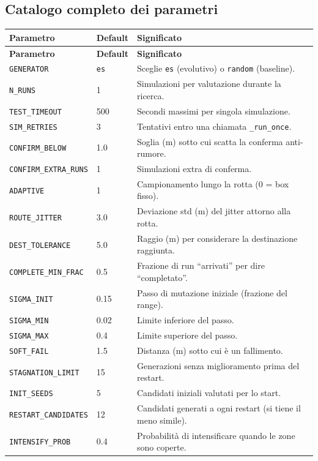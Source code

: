 \documentclass[11pt,a4paper]{report}
\newcommand{\code}[1]{\texttt{#1}}
\begin{document}
\subsection{Catalogo completo dei parametri}
\begin{longtable}{L{3.6cm} L{1.8cm} L{8.6cm}}
\toprule
\textbf{Parametro} & \textbf{Default} & \textbf{Significato}\\
\midrule
\endfirsthead
\toprule
\textbf{Parametro} & \textbf{Default} & \textbf{Significato}\\
\midrule
\endhead
\code{GENERATOR} & \code{es} & Sceglie \code{es} (evolutivo) o \code{random} (baseline).\\
\code{N\_RUNS} & 1 & Simulazioni per valutazione durante la ricerca.\\
\code{TEST\_TIMEOUT} & 500 & Secondi massimi per singola simulazione.\\
\code{SIM\_RETRIES} & 3 & Tentativi entro una chiamata \code{\_run\_once}.\\
\code{CONFIRM\_BELOW} & 1.0 & Soglia (m) sotto cui scatta la conferma anti-rumore.\\
\code{CONFIRM\_EXTRA\_RUNS} & 1 & Simulazioni extra di conferma.\\
\code{ADAPTIVE} & 1 & Campionamento lungo la rotta ($0$ = box fisso).\\
\code{ROUTE\_JITTER} & 3.0 & Deviazione std (m) del jitter attorno alla rotta.\\
\code{DEST\_TOLERANCE} & 5.0 & Raggio (m) per considerare la destinazione raggiunta.\\
\code{COMPLETE\_MIN\_FRAC} & 0.5 & Frazione di run ``arrivati'' per dire ``completato''.\\
\code{SIGMA\_INIT} & 0.15 & Passo di mutazione iniziale (frazione del range).\\
\code{SIGMA\_MIN} & 0.02 & Limite inferiore del passo.\\
\code{SIGMA\_MAX} & 0.4 & Limite superiore del passo.\\
\code{SOFT\_FAIL} & 1.5 & Distanza (m) sotto cui è un fallimento.\\
\code{STAGNATION\_LIMIT} & 15 & Generazioni senza miglioramento prima del restart.\\
\code{INIT\_SEEDS} & 5 & Candidati iniziali valutati per lo start.\\
\code{RESTART\_CANDIDATES} & 12 & Candidati generati a ogni restart (si tiene il meno simile).\\
\code{INTENSIFY\_PROB} & 0.4 & Probabilità di intensificare quando le zone sono coperte.\\

\end{longtable}
\end{document}
